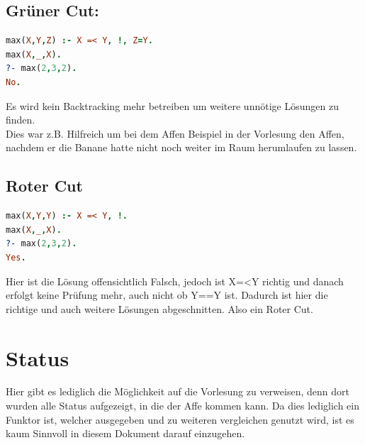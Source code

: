 \subsection{Grüner Cut:}
\begin{lstlisting}[language=Prolog] 
max(X,Y,Z) :- X =< Y, !, Z=Y.
max(X,_,X).
?- max(2,3,2).
No.
\end{lstlisting}
Es wird kein Backtracking mehr betreiben um weitere unnötige Lösungen zu finden. \\
Dies war z.B. Hilfreich um bei dem Affen Beispiel in der Vorlesung den Affen, nachdem er die Banane hatte nicht noch weiter im Raum herumlaufen zu lassen. \\
\subsection{Roter Cut}
\begin{lstlisting}[language=Prolog] 
max(X,Y,Y) :- X =< Y, !.
max(X,_,X).
?- max(2,3,2).
Yes.
\end{lstlisting}
Hier ist die Lösung offensichtlich Falsch, jedoch ist X=<Y richtig und danach erfolgt keine Prüfung mehr, auch nicht ob Y==Y ist. Dadurch ist hier die richtige und auch weitere Lösungen abgeschnitten. Also ein Roter Cut.

\section{Status}
Hier gibt es lediglich die Möglichkeit auf die Vorlesung zu verweisen, denn dort wurden alle Status aufgezeigt, in die der Affe kommen kann. Da dies lediglich ein Funktor ist, welcher ausgegeben und zu weiteren vergleichen genutzt wird, ist es kaum Sinnvoll in diesem Dokument darauf einzugehen. 